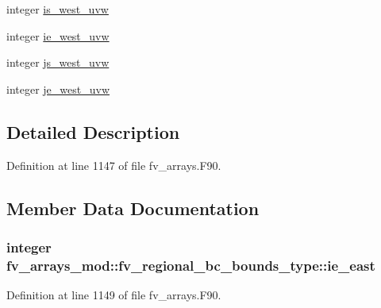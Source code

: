 \begin{DoxyCompactItemize}
\item 
integer \hyperlink{structfv__arrays__mod_1_1fv__regional__bc__bounds__type_ac2deaff88f899b9dbee780db2f70877a}{is\-\_\-west\-\_\-uvw}
\item 
integer \hyperlink{structfv__arrays__mod_1_1fv__regional__bc__bounds__type_a04bb7bab42d4d800e83e0516dd157373}{ie\-\_\-west\-\_\-uvw}
\item 
integer \hyperlink{structfv__arrays__mod_1_1fv__regional__bc__bounds__type_a05f07532dd5f7a68570bf69658d4fee8}{js\-\_\-west\-\_\-uvw}
\item 
integer \hyperlink{structfv__arrays__mod_1_1fv__regional__bc__bounds__type_a85e3d9364559211708e4e15f74ea1311}{je\-\_\-west\-\_\-uvw}
\end{DoxyCompactItemize}


\subsection{Detailed Description}


Definition at line 1147 of file fv\-\_\-arrays.\-F90.



\subsection{Member Data Documentation}
\subsubsection[{ie\-\_\-east}]{\setlength{\rightskip}{0pt plus 5cm}integer fv\-\_\-arrays\-\_\-mod\-::fv\-\_\-regional\-\_\-bc\-\_\-bounds\-\_\-type\-::ie\-\_\-east}\label{structfv__arrays__mod_1_1fv__regional__bc__bounds__type_a34c26162b5ada53ebb8a5dd38ee6205d}


Definition at line 1149 of file fv\-\_\-arrays.\-F90.

